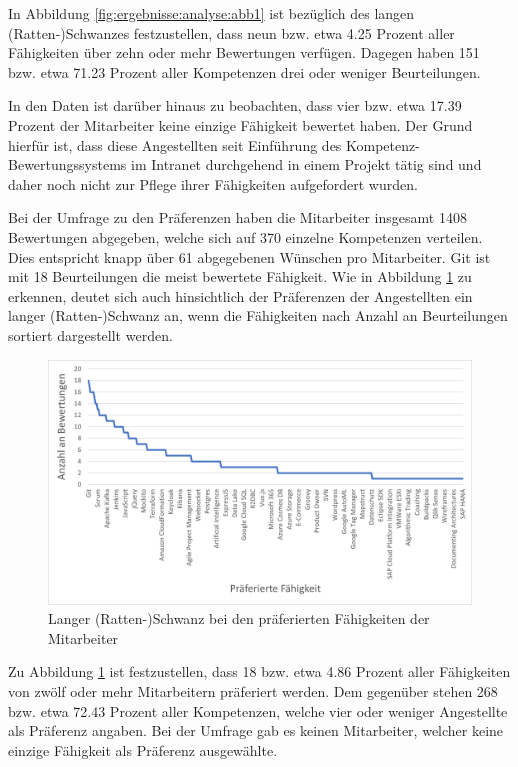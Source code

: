 In Abbildung \ref{fig:ergebnisse:analyse:abb1} ist bezüglich des langen (Ratten-)Schwanzes festzustellen, dass neun bzw. etwa 4.25 Prozent aller Fähigkeiten über zehn oder mehr Bewertungen verfügen. Dagegen haben 151 bzw. etwa 71.23 Prozent aller Kompetenzen drei oder weniger Beurteilungen.

In den Daten ist darüber hinaus zu beobachten, dass vier bzw. etwa 17.39 Prozent der Mitarbeiter keine einzige Fähigkeit bewertet haben. Der Grund hierfür ist, dass diese Angestellten seit Einführung des Kompetenz-Bewertungssystems im Intranet durchgehend in einem Projekt tätig sind und daher noch nicht zur Pflege ihrer Fähigkeiten aufgefordert wurden.

Bei der Umfrage zu den Präferenzen haben die Mitarbeiter insgesamt 1408 Bewertungen abgegeben, welche sich auf 370 einzelne Kompetenzen verteilen. Dies entspricht knapp über 61 abgegebenen Wünschen pro Mitarbeiter. Git ist mit 18 Beurteilungen die meist bewertete Fähigkeit. Wie in Abbildung \ref{fig:ergebnisse:analyse:abb2} zu erkennen, deutet sich auch hinsichtlich der Präferenzen der Angestellten ein langer (Ratten-)Schwanz an, wenn die Fähigkeiten nach Anzahl an Beurteilungen sortiert dargestellt werden.
 
\begin{figure}[h]
	\centering
	\includegraphics[width=1\textwidth]{gfx/long-tail-praeferenzen.png}
	\caption{Langer (Ratten-)Schwanz bei den präferierten Fähigkeiten der Mitarbeiter}
	\label{fig:ergebnisse:analyse:abb2}
\end{figure}

Zu Abbildung \ref{fig:ergebnisse:analyse:abb2} ist festzustellen, dass 18 bzw. etwa 4.86 Prozent aller Fähigkeiten von zwölf oder mehr Mitarbeitern präferiert werden. Dem gegenüber stehen 268 bzw. etwa 72.43 Prozent aller Kompetenzen, welche vier oder weniger Angestellte als Präferenz angaben. Bei der Umfrage gab es keinen Mitarbeiter, welcher keine einzige Fähigkeit als Präferenz ausgewählte.

